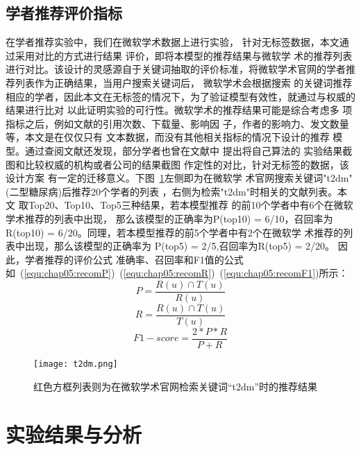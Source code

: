 \subsection{学者推荐评价指标}
在学者推荐实验中，我们在微软学术数据上进行实验，%
针对无标签数据，本文通过采用对比的方式进行结果%
评价，即将本模型的推荐结果与微软学%
术的推荐列表进行对比。该设计的灵感源自于关键词抽取的评价标准，将微软学术官网的学者推%
荐列表作为正确结果，当用户搜索关键词后，%
微软学术会根据搜索%
的关键词推荐相应的学者，因此本文在无标签的情况下，为了验证模型有效性，就通过与权威的结果进行比对%
以此证明实验的可行性。微软学术的推荐结果可能是综合考虑多%
项指标之后，例如文献的引用次数、下载量、影响因%
子，作者的影响力、发文数量等，本文是在仅仅只有%
文本数据，而没有其他相关指标的情况下设计的推荐%
模型。通过查阅文献还发现，部分学者也曾在文献中%
提出将自己算法的%
实验结果截图和比较权威的机构或者公司的结果截图%
作定性的对比，针对无标签的数据，该设计方案%
有一定的迁移意义。下图~\ref{fig:t2dm}左侧即为在微软学%
术官网搜索关键词"t2dm"(二型糖尿病)后推荐20个学者的列表%
，右侧为检索"t2dm"时相关的文献列表。本文%
取Top20、Top10、Top5三种结果，若本模型推荐%
的前10个学者中有6个在微软学术推荐的列表中出现，%
那么该模型的正确率为P(top10) = 6/10，召回率为R(top10) = 6/20。同理，若本模型推荐的前5个学者中有2个在微软学%
术推荐的列表中出现，那么该模型的正确率为%
P(top5) = 2/5,召回率为R(top5) = 2/20。
因此，学者推荐的评价公式
准确率、召回率和F1值的公式如~(\ref{equ:chap05:recomP})~(\ref{equ:chap05:recomR})~(\ref{equ:chap05:recomF1})所示：
\begin{equation}
\label{equ:chap05:recomP}
P = \frac{R(u) \cap T(u)}{R(u)}
\end{equation}
\begin{equation}
\label{equ:chap05:recomR}
R = \frac{R(u) \cap T(u)}{T(u)}
\end{equation}
\begin{equation}
\label{equ:chap05:recomF1}
F1-score = \frac{2*P*R}{P+R}
\end{equation}

\begin{figure}[htbp] %
  \centering
  \texttt{[image: t2dm.png]}
  \caption{红色方框列表则为在微软学术官网检索关键词“t2dm”时的推荐结果}
  \label{fig:t2dm}
\end{figure}

\section{实验结果与分析}

